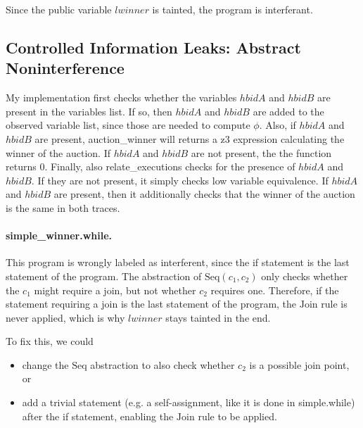 \documentclass[12pt,a4paper]{article}
\begin{document}
Since the public variable $lwinner$ is tainted, the program is interferant.

\subsection{Controlled Information Leaks: Abstract Noninterference}
My implementation first checks whether the variables $hbidA$ and $hbidB$ are present in the variables list.
If so, then $hbidA$ and $hbidB$ are added to the observed variable list, since those are needed to compute 
$\phi$. Also, if $hbidA$ and $hbidB$ are present, auction\_winner will returns a z3 expression calculating
the winner of the auction. If $hbidA$ and $hbidB$ are not present, the the function returns $0$. Finally,
also relate\_executions checks for the presence of $hbidA$ and $hbidB$. If they are not present, it simply 
checks low variable equivalence. If $hbidA$ and $hbidB$ are present, then it additionally checks that the 
winner of the auction is the same in both traces.

\paragraph{simple\_winner.while.} This program is wrongly labeled as interferent, since the if statement is 
the last statement of the program. The abstraction of $\mathrm{Seq}(c_1,c_2)$ only checks whether the $c_1$ 
might require a join, but not whether $c_2$ requires one. Therefore, if the statement requiring a join is 
the last statement of the program, the $\mathrm{Join}$ rule is never applied, which is why $lwinner$ stays 
tainted in the end.

To fix this, we could 
\begin{itemize}
    \item change the $\mathrm{Seq}$ abstraction to also check whether $c_2$ is a possible join point, or
    \item add a trivial statement (e.g. a self-assignment, like it is done in simple.while) after 
          the if statement, enabling the $\mathrm{Join}$ rule to be applied.
\end{itemize}
\end{document}
